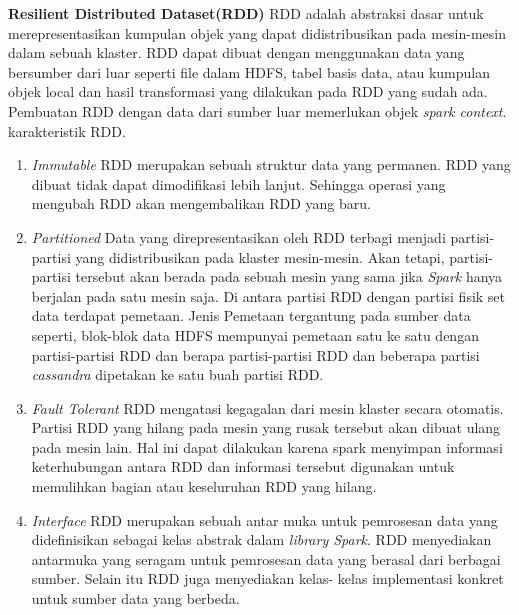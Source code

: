 \documentclass[a4paper,twoside]{article}
\begin{document}
\begin{enumerate}
	\textbf{Resilient Distributed Dataset(RDD)}\newline
	RDD adalah abstraksi dasar untuk merepresentasikan kumpulan objek yang dapat didistribusikan 			pada mesin-mesin dalam sebuah klaster. RDD dapat dibuat dengan menggunakan data yang bersumber 			dari luar seperti file dalam HDFS, tabel basis data, atau kumpulan objek local dan hasil 				transformasi yang dilakukan pada RDD yang sudah ada. Pembuatan RDD dengan data dari sumber luar 		memerlukan objek \textit{spark context}. karakteristik RDD.
	
	\begin{enumerate}
	\item{\textit{Immutable}\newline
	RDD merupakan sebuah struktur data yang permanen. RDD yang dibuat tidak dapat dimodifikasi lebih 	lanjut. Sehingga operasi yang mengubah RDD akan mengembalikan RDD yang baru.
	}
	
	\item{\textit{Partitioned}\newline
	Data yang direpresentasikan oleh RDD terbagi menjadi partisi-partisi yang didistribusikan pada 			klaster mesin-mesin. Akan tetapi, partisi-partisi tersebut akan berada pada sebuah mesin yang 			sama jika \textit{Spark} hanya berjalan pada satu mesin saja. Di antara partisi RDD dengan 				partisi fisik set data terdapat pemetaan. Jenis Pemetaan tergantung pada sumber data seperti, 			blok-blok data HDFS mempunyai pemetaan satu ke satu dengan partisi-partisi RDD dan berapa 				partisi-partisi RDD dan beberapa partisi \textit{cassandra} dipetakan ke satu buah partisi RDD.
	}
	
	\item{\textit{Fault Tolerant}\newline
	RDD mengatasi kegagalan dari mesin klaster secara otomatis. Partisi RDD yang hilang pada mesin 			yang rusak tersebut akan dibuat ulang pada mesin lain. Hal ini dapat dilakukan karena spark 			menyimpan informasi keterhubungan antara RDD dan informasi tersebut digunakan untuk memulihkan 			bagian atau keseluruhan RDD yang hilang.
	}
	
	\item{\textit{Interface}\newline
	RDD merupakan sebuah antar muka untuk pemrosesan data yang didefinisikan sebagai kelas 					abstrak dalam \textit{library Spark}. RDD menyediakan antarmuka yang seragam untuk 						pemrosesan data yang berasal dari berbagai sumber. Selain itu RDD juga menyediakan kelas-				kelas implementasi konkret untuk sumber data yang berbeda.	
	}
	

\end{enumerate}
\end{enumerate}
\end{document}
